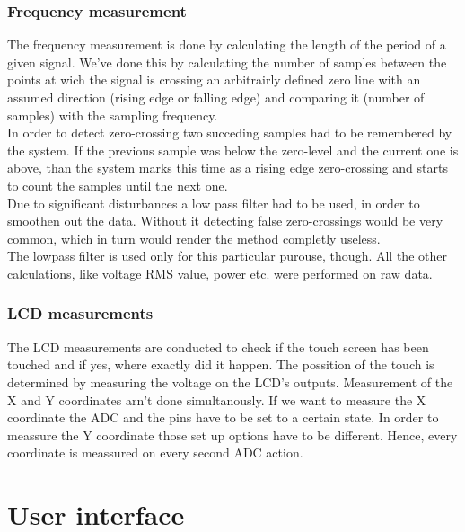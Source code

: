 \subsubsection{Frequency measurement}
The frequency measurement is done by calculating the length of the period of a given signal. We've done this by calculating the number of samples between the points at wich the signal is crossing an arbitrairly defined zero line with an assumed direction (rising edge or falling edge) and comparing it (number of samples) with the sampling frequency.\\
In order to detect zero-crossing two succeding samples had to be remembered by the system. If the previous sample was below the zero-level and the current one is above, than the system marks this time as a rising edge zero-crossing and starts to count the samples until the next one.\\
Due to significant disturbances a low pass filter had to be used, in order to smoothen out the data. Without it detecting false zero-crossings would be very common, which in turn would render the method completly useless.\\
The lowpass filter is used only for this particular purouse, though. All the other calculations, like voltage RMS value, power etc. were performed on raw data.

\subsubsection{LCD measurements}
The LCD measurements are conducted to check if the touch screen has been touched and if yes, where exactly did it happen. The possition of the touch is determined by measuring the voltage on the LCD's outputs. Measurement of the X and Y coordinates arn't done simultanously. If we want to measure the X coordinate the ADC and the pins have to be set to a certain state. In order to meassure the Y coordinate those set up options have to be different. Hence, every coordinate is meassured on every second ADC action.

 
\section{User interface}
